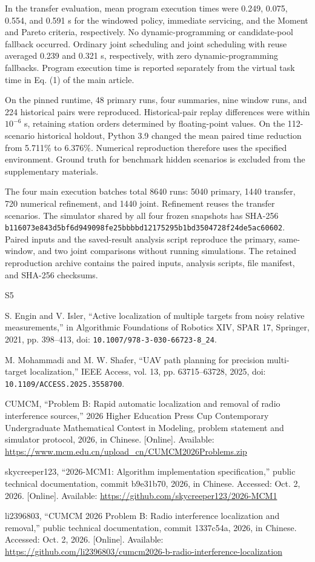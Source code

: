 \documentclass[11pt,letterpaper]{article}
\begin{document}
In the transfer evaluation, mean program execution times were 0.249, 0.075, 0.554, and 0.591 s for the windowed policy, immediate servicing, and the Moment and Pareto criteria, respectively. No dynamic-programming or candidate-pool fallback occurred. Ordinary joint scheduling and joint scheduling with reuse averaged 0.239 and 0.321 s, respectively, with zero dynamic-programming fallbacks. Program execution time is reported separately from the virtual task time in Eq. (1) of the main article.

On the pinned runtime, 48 primary runs, four summaries, nine window runs, and 224 historical pairs were reproduced. Historical-pair replay differences were within $10^{-6}$ s, retaining station orders determined by floating-point values. On the 112-scenario historical holdout, Python 3.9 changed the mean paired time reduction from 5.711\% to 6.376\%. Numerical reproduction therefore uses the specified environment. Ground truth for benchmark hidden scenarios is excluded from the supplementary materials.

The four main execution batches total 8640 runs: 5040 primary, 1440 transfer, 720 numerical refinement, and 1440 joint. Refinement reuses the transfer scenarios. The simulator shared by all four frozen snapshots has SHA-256 \nolinkurl{b116073e843d5bf6d949098fe25bbbbd12175295b1bd3504728f24de5ac60602}. Paired inputs and the saved-result analysis script reproduce the primary, same-window, and two joint comparisons without running simulations. The retained reproduction archive contains the paired inputs, analysis scripts, file manifest, and SHA-256 checksums.
\begin{thebibliography}{S5}

 S. Engin and V. Isler, ``Active localization of multiple targets from noisy relative measurements,'' in Algorithmic Foundations of Robotics XIV, SPAR 17, Springer, 2021, pp. 398--413, doi: \nolinkurl{10.1007/978-3-030-66723-8_24}.

 M. Mohammadi and M. W. Shafer, ``UAV path planning for precision multi-target localization,'' IEEE Access, vol. 13, pp. 63715--63728, 2025, doi: \nolinkurl{10.1109/ACCESS.2025.3558700}.

 CUMCM, ``Problem B: Rapid automatic localization and removal of radio interference sources,'' 2026 Higher Education Press Cup Contemporary Undergraduate Mathematical Contest in Modeling, problem statement and simulator protocol, 2026, in Chinese. [Online]. Available: \url{https://www.mcm.edu.cn/upload_cn/CUMCM2026Problems.zip}

 skycreeper123, ``2026-MCM1: Algorithm implementation specification,'' public technical documentation, commit b9e31b70, 2026, in Chinese. Accessed: Oct. 2, 2026. [Online]. Available: \url{https://github.com/skycreeper123/2026-MCM1}

 li2396803, ``CUMCM 2026 Problem B: Radio interference localization and removal,'' public technical documentation, commit 1337c54a, 2026, in Chinese. Accessed: Oct. 2, 2026. [Online]. Available: \url{https://github.com/li2396803/cumcm2026-b-radio-interference-localization}

\end{thebibliography}
\end{document}
